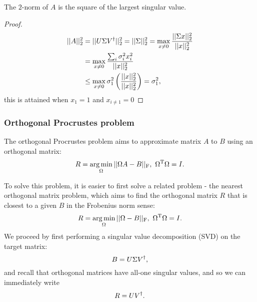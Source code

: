 \documentclass{article}
\begin{document}
\begin{theorem}
    The $2$-norm of $A$ is the square of the largest singular value.
\end{theorem}
\begin{proof}
    \begin{align}
        ||A||_2^2&=||U\Sigma V^{\dagger}||_2^2=||\Sigma||_2^2=\max_{x\neq 0}\frac{||\Sigma x||_2^2}{||x||_2^2}\\
        &=\max_{x\neq 0}\frac{\sum_i\sigma_i^2x_i^2}{||x||_2^2}\\
        &\leq\max_{x\neq 0}\sigma_1^2\left( \frac{||x||_2^2}{||x||_2^2} \right)=\sigma_1^2,
    \end{align}
    this is attained when $x_1=1$ and $x_{i\neq1}=0$
\end{proof}

\subsubsection{Orthogonal Procrustes problem}
The orthogonal Procrustes problem aims to approximate matrix $A$ to $B$ using an orthogonal matrix:
\begin{equation}
R=\argmin_{\Omega}||\Omega A-B||_{\mathrm{F}},\ \Omega^{\mathrm{T}}\Omega=I.
\end{equation}

To solve this problem, it is easier to first solve a related problem - the nearest orthogonal matrix problem, which aims to find the orthogonal matrix $R$ that is closest to a given $B$ in the Frobenius norm sense:
\begin{equation}
R = \argmin_{\Omega}||\Omega-B||_{\mathrm{F}},\ \Omega^{\mathrm{T}}\Omega=I.
\end{equation}
We proceed by first performing a singular value decomposition (SVD) on the target matrix:
\begin{equation}
    B = U\Sigma V^{\dagger},
\end{equation}
and recall that orthogonal matrices have all-one singular values, and so we can immediately write
\begin{equation}
    R= UV^{\dagger}.
\end{equation}
\end{document}
